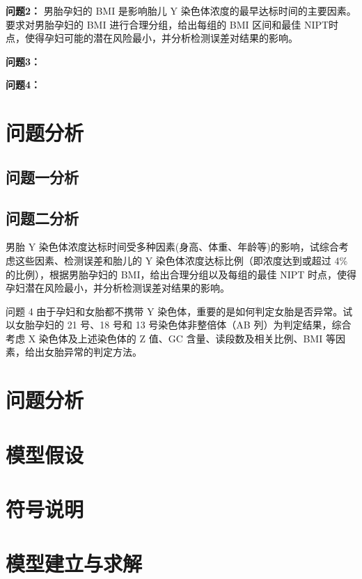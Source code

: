 \documentclass[withoutpreface,bwprint]{cumcmthesis} %
\begin{document}
\textbf{问题2：}
男胎孕妇的 BMI 是影响胎儿 Y 染色体浓度的最早达标时间的主要因素。要求对男胎孕妇的 BMI 进行合理分组，给出每组的 BMI 区间和最佳 NIPT时点，使得孕妇可能的潜在风险最小，并分析检测误差对结果的影响。

\textbf{问题3：}

\textbf{问题4：}

\section{问题分析}

\subsection{问题一分析}

\subsection{问题二分析}


男胎 Y 染色体浓度达标时间受多种因素(身高、体重、年龄等)的影响，试综合考虑这些因素、检测误差和胎儿的 Y 染色体浓度达标比例（即浓度达到或超过 4\%的比例），根据男胎孕妇的 BMI，给出合理分组以及每组的最佳 NIPT 时点，使得孕妇潜在风险最小，并分析检测误差对结果的影响。

问题 4 由于孕妇和女胎都不携带 Y 染色体，重要的是如何判定女胎是否异常。试以女胎孕妇的 21
号、18 号和 13 号染色体非整倍体（AB 列）为判定结果，综合考虑 X 染色体及上述染色体的 Z 值、GC
含量、读段数及相关比例、BMI 等因素，给出女胎异常的判定方法。



\section{问题分析}


\section{模型假设}




\section{符号说明}


\section{模型建立与求解}
\end{document}
